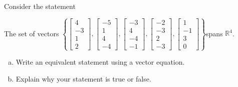 
\begin{exerciseStatement}


Consider the statement 
\begin{center}\begin{minipage}{0.8\textwidth}
 The set of vectors \( \left\{ \left[\begin{array}{c}
4 \\
-3 \\
1 \\
2
\end{array}\right] , \left[\begin{array}{c}
-5 \\
1 \\
4 \\
-4
\end{array}\right] , \left[\begin{array}{c}
-3 \\
4 \\
-4 \\
-1
\end{array}\right] , \left[\begin{array}{c}
-2 \\
-3 \\
2 \\
-3
\end{array}\right] , \left[\begin{array}{c}
1 \\
-1 \\
3 \\
0
\end{array}\right] \right\} \)spans \(\mathbb{R}^4\). 
\end{minipage}\end{center}
    


\begin{enumerate}[(a)]
\item  Write an equivalent statement using a vector equation.
\item  Explain why your statement is true or false.
\end{enumerate}
    
\end{exerciseStatement}
    
